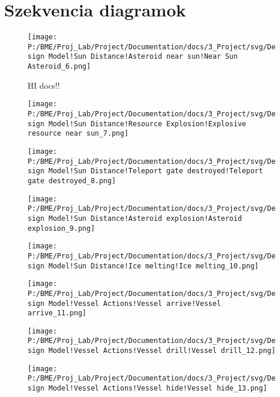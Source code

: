 \section{Szekvencia diagramok}
\begin{figure}[H] 
\centering 
\texttt{[image: P:/BME/Proj\_Lab/Project/Documentation/docs/3\_Project/svg/Design Model!Sun Distance!Asteroid near sun!Near Sun Asteroid\_6.png]} 
\caption{HI docs!!} 
\end{figure} 

\begin{figure}[H] 
\centering 
\texttt{[image: P:/BME/Proj\_Lab/Project/Documentation/docs/3\_Project/svg/Design Model!Sun Distance!Resource Explosion!Explosive resource near sun\_7.png]} 
\end{figure} 

\begin{figure}[H] 
\centering 
\texttt{[image: P:/BME/Proj\_Lab/Project/Documentation/docs/3\_Project/svg/Design Model!Sun Distance!Teleport gate destroyed!Teleport gate destroyed\_8.png]} 
\end{figure} 

\begin{figure}[H] 
\centering 
\texttt{[image: P:/BME/Proj\_Lab/Project/Documentation/docs/3\_Project/svg/Design Model!Sun Distance!Asteroid explosion!Asteroid explosion\_9.png]} 
\end{figure} 

\begin{figure}[H] 
\centering 
\texttt{[image: P:/BME/Proj\_Lab/Project/Documentation/docs/3\_Project/svg/Design Model!Sun Distance!Ice melting!Ice melting\_10.png]} 
\end{figure} 

\begin{figure}[H] 
\centering 
\texttt{[image: P:/BME/Proj\_Lab/Project/Documentation/docs/3\_Project/svg/Design Model!Vessel Actions!Vessel arrive!Vessel arrive\_11.png]} 
\end{figure} 

\begin{figure}[H] 
\centering 
\texttt{[image: P:/BME/Proj\_Lab/Project/Documentation/docs/3\_Project/svg/Design Model!Vessel Actions!Vessel drill!Vessel drill\_12.png]} 
\end{figure} 

\begin{figure}[H] 
\centering 
\texttt{[image: P:/BME/Proj\_Lab/Project/Documentation/docs/3\_Project/svg/Design Model!Vessel Actions!Vessel hide!Vessel hide\_13.png]} 
\end{figure} 

